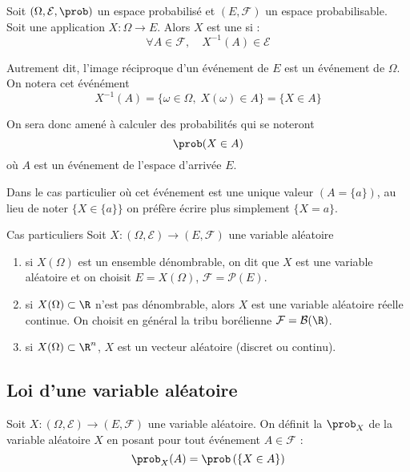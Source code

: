 \begin{definition}{}{}
  Soit $(\Omega,\mathcal{E},\prob )$ un espace probabilisé et $(E,\mathcal{F})$ un espace probabilisable. Soit une application $X \colon \Omega \to E$. Alors $X$ est une  si :
  $$\forall A \in \mathcal{F}, \quad X^{-1}(A) \in \mathcal{E}$$
  
  Autrement dit, l'image réciproque d'un événement de $E$ est un événement de $\Omega$. On notera cet événément 
  $$X^{-1}(A) = \{\omega \in \Omega, \; X(\omega)\in A\} = \{X \in A\}$$
\end{definition}

On sera donc amené à calculer des probabilités qui se noteront $$\prob(X \in A)$$ où $A$ est un événement de l'espace d'arrivée $E$. 

Dans le cas particulier où cet événement est une unique valeur $(A = \{a\})$, au lieu de noter  $\{X \in \{a\}\}$ on préfère écrire plus simplement  $\{X=a\}$.

\begin{definition}{Cas particuliers}{}
	Soit $X \colon (\Omega,\mathcal{E}) \to (E,\mathcal{F})$ une variable aléatoire
	\begin{enumerate}
		\item si $X(\Omega)$ est un ensemble dénombrable, on dit que $X$ est une variable aléatoire  et on choisit $E=X(\Omega)$, $\mathcal{F}=\mathcal{P}(E)$. 
		\item si $X(\Omega) \subset \R$ n'est pas dénombrable, alors $X$ est une variable aléatoire réelle continue. On choisit en général la tribu borélienne $\mathcal{F}=\mathcal{B}(\R)$. 
		\item si $X(\Omega) \subset \R^n$, $X$ est un vecteur aléatoire (discret ou continu).
	\end{enumerate}
\end{definition}

\subsection{Loi d'une variable aléatoire}

\begin{definition}{}{}
		Soit $X \colon (\Omega,\mathcal{E}) \to (E,\mathcal{F})$ une variable aléatoire. On définit la  $\prob_X$ de la variable aléatoire $X$ en posant pour tout événement $A \in \mathcal{F}$ : $$\prob_X(A)=\prob\left(\{X \in A\}\right)$$
\end{definition}


